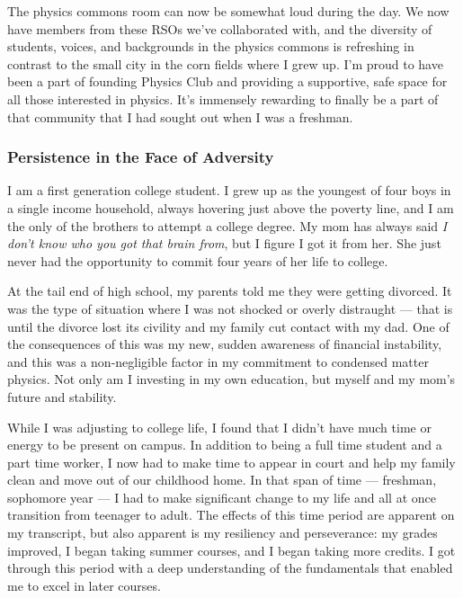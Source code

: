 \documentclass[11pt]{article}
\begin{document}
The physics commons room can now be somewhat loud during the day. We now have members from these RSOs we've collaborated with, and the diversity of students, voices, and backgrounds in the physics commons is refreshing in contrast to the small city in the corn fields where I grew up. I'm proud to have been a part of founding Physics Club and providing a supportive, safe space for all those interested in physics. It's immensely rewarding to finally be a part of that community that I had sought out when I was a freshman.
\subsubsection*{Persistence in the Face of Adversity}
I am a first generation college student. I grew up as the youngest of four boys in a single income household, always hovering just above the poverty line, and I am the only of the brothers to attempt a college degree. My mom has always said \textit{I don't know who you got that brain from}, but I figure I got it from her. She just never had the opportunity to commit four years of her life to college.

At the tail end of high school, my parents told me they were getting divorced. It was the type of situation where I was not shocked or overly distraught --- that is until the divorce lost its civility and my family cut contact with my dad. One of the consequences of this was my new, sudden awareness of financial instability, and this was a non-negligible factor in my commitment to condensed matter physics. Not only am I investing in my own education, but myself and my mom's future and stability.

While I was adjusting to college life, I found that I didn't have much time or energy to be present on campus. In addition to being a full time student and a part time worker, I now had to make time to appear in court and help my family clean and move out of our childhood home. In that span of time --- freshman, sophomore year --- I had to make significant change to my life and all at once transition from teenager to adult. The effects of this time period are apparent on my transcript, but also apparent is my resiliency and perseverance: my grades improved, I began taking summer courses, and I began taking more credits. I got through this period with a deep understanding of the fundamentals that enabled me to excel in later courses.
\end{document}
